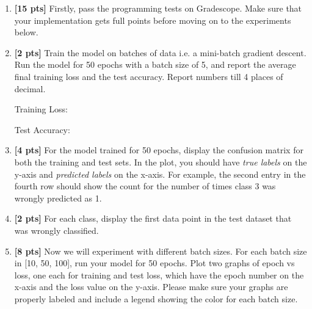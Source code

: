 \begin{enumerate}

    \item \textbf{[15 pts]} Firstly, pass the programming tests on Gradescope. Make sure that your implementation gets full points before moving on to the experiments below.

    
    \item \textbf{[2 pts]} Train the model on batches of data i.e. a mini-batch gradient descent. Run the model for 50 epochs with a batch size of 5, and report the average final training loss and the test accuracy. Report numbers till 4 places of decimal.

    
    \begin{tcolorbox}[fit,height=1cm, width=5cm, blank, borderline={1pt}{-2pt}]
    Training Loss: %
    \end{tcolorbox}
    \begin{tcolorbox}[fit,height=1cm, width=5cm, blank, borderline={1pt}{-2pt}]
    Test Accuracy: %
    \end{tcolorbox}
    
    \clearpage
    \item \textbf{[4 pts]} For the model trained for 50 epochs, display the confusion matrix for both the training and test sets. In the plot, you should have \emph{true labels} on the y-axis and \emph{predicted labels} on the x-axis. For example, the second entry in the fourth row should show the count for the number of times class 3 was wrongly predicted as 1.
    
    \begin{tcolorbox}[fit,height=8cm, width=0.95\textwidth, blank, borderline={1pt}{-2pt}]
    \end{tcolorbox}
    
    
    \item \textbf{[2 pts]} For each class, display the first data point in the test dataset that was wrongly classified.

    \begin{tcolorbox}[fit,height=3cm, width=0.95\textwidth, blank, borderline={1pt}{-2pt}]
    \end{tcolorbox}
    
    \clearpage
    \item \textbf{[8 pts]} Now we will experiment with different batch sizes. For each batch size in [10, 50, 100], run your model for 50 epochs. Plot two graphs of epoch vs loss, one each for training and test loss, which have the epoch number on the x-axis and the loss value on the y-axis.  Please make sure your graphs are properly labeled and include a legend showing the color for each batch size.
    

\end{enumerate}
